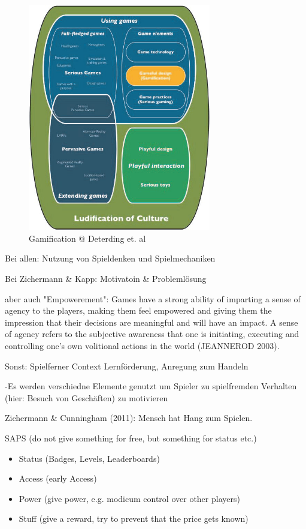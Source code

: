 \begin{figure}[H]
\begin{center}
\includegraphics[width=80mm]{images/ch3_img02_gamification.png}
\caption{Gamification @ Deterding et. al}
\label{img:ch3_img01_LBG_SN_etc}
\end{center}
\end{figure}

Bei allen:
Nutzung von Spieldenken und Spielmechaniken

Bei Zichermann \& Kapp:
Motivatoin \& Problemlösung

aber auch "Empowerement":
Games have a strong ability of imparting a sense of agency to the players, making them feel
empowered and giving them the impression that their decisions are meaningful and will
have an impact. A sense of agency refers to the subjective awareness that one is initiating,
executing and controlling one’s own volitional actions in the world (JEANNEROD 2003).

Sonst:
Spielferner Context
Lernförderung, Anregung zum Handeln

-Es werden verschiedne Elemente genutzt um Spieler zu spielfremden Verhalten (hier: Besuch von Geschäften) zu motivieren


Zichermann \& Cunningham (2011):
Mensch hat Hang zum Spielen.

SAPS (do not give something for free, but something for status etc.)

\begin{itemize}
      \item Status (Badges, Levels, Leaderboards)
      \item Access (early Access)
      \item Power (give power, e.g. modicum control over other players)
      \item Stuff (give a reward, try to prevent that the price gets known)
\end{itemize}

